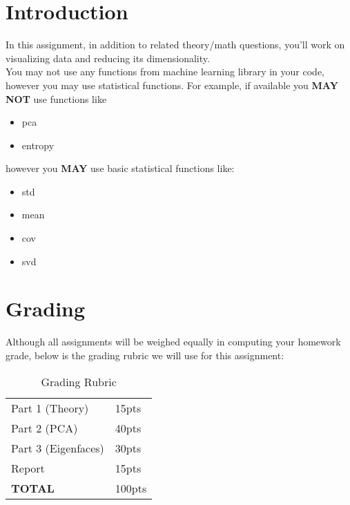 \documentclass[12pt]{article}
\begin{document}
\maketitle

\section*{Introduction}
In this assignment, in addition to related theory/math questions, you'll work on visualizing data and reducing its dimensionality.\\

\noindent
You may not use any functions from machine learning library in your code, however you may use statistical functions.  For example, if available you \textbf{MAY NOT} use functions like
\begin{itemize}
\item pca
\item entropy
\end{itemize}

\noindent
however you \textbf{MAY} use basic statistical functions like:
\begin{itemize}
\item std
\item mean
\item cov
\item svd
\end{itemize}


\section*{Grading}
Although all assignments will be weighed equally in computing your homework grade, below is the grading rubric we will use for this assignment:

\begin{table}[h]
\begin{centering}
\begin{tabular}{|l|l|}
\hline
Part 1 (Theory) & 15pts \\
Part 2 (PCA) & 40pts\\
Part 3 (Eigenfaces) & 30pts\\
Report & 15pts\\
\hline
\textbf{TOTAL} & 100pts\\
\hline
\end{tabular}
\caption{Grading Rubric}
\end{centering}
\end{table}

\newpage
\end{document}
